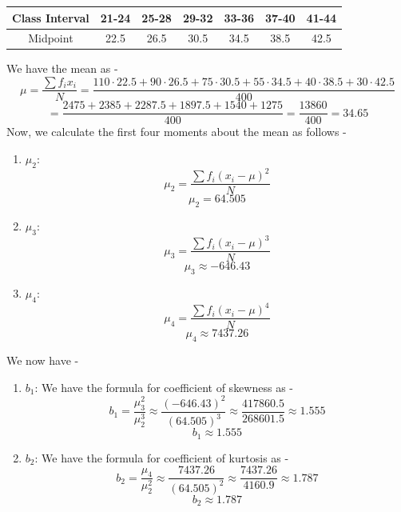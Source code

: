 \begin{enumerate}
\begin{center}
        \begin{tabular}{|c|cccccc|}
            \hline 
            Class Interval & 21-24 & 25-28 & 29-32 & 33-36 & 37-40 & 41-44 \\
            \hline
            Midpoint & 22.5 & 26.5 & 30.5 & 34.5 & 38.5 & 42.5 \\
            \hline
        \end{tabular}
    \end{center}
    We have the mean as -
    \[\mu = \frac{\sum f_i x_i}{N} = \frac{110 \cdot 22.5 + 90 \cdot 26.5 + 75 \cdot 30.5 + 55 \cdot 34.5 + 40 \cdot 38.5 + 30 \cdot 42.5}{400}\]
    \[= \frac{2475 + 2385 + 2287.5 + 1897.5 + 1540 + 1275}{400} = \frac{13860}{400} = 34.65\]
    Now, we calculate the first four moments about the mean as follows -
    \begin{enumerate}
        \item $\mu_2$:
        \[\mu_2 = \frac{\sum f_i (x_i - \mu)^2}{N}\]
        \[\boxed{\mu_2 = 64.505
        }\]
        \item $\mu_3$:
        \[\mu_3 = \frac{\sum f_i (x_i - \mu)^3}{N}\]
        \[\boxed{\mu_3 \approx -646.43
        }\]
        \item $\mu_4$:
        \[\mu_4 = \frac{\sum f_i (x_i - \mu)^4}{N}\]
        \[\boxed{\mu_4 \approx 7437.26
        }\]
    \end{enumerate}
    We now have -
    \begin{enumerate}
        \item $b_1$:
        We have the formula for coefficient of skewness as -
        \[b_1 = \frac{\mu_3^2}{\mu_2^3} \approx \frac{(-646.43)^2}{(64.505)^3} \approx \frac{417860.5}{268601.5} \approx 1.555\]
        \[\boxed{b_1 \approx 1.555
        }\]
        \item $b_2$:
        We have the formula for coefficient of kurtosis as -
        \[b_2 = \frac{\mu_4}{\mu_2^2} \approx \frac{7437.26}{(64.505)^2} \approx \frac{7437.26}{4160.9} \approx 1.787\]
        \[\boxed{b_2 \approx 1.787
        }\]
    \end{enumerate}
\end{enumerate}
